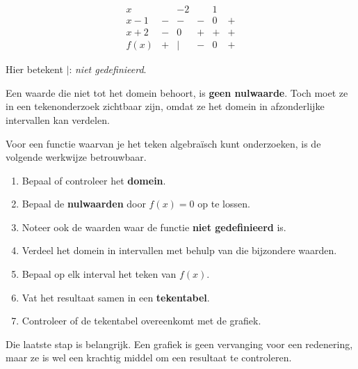 \documentclass{ximera}
\begin{document}
\[
\begin{array}{c|ccccc}
x & & -2 &  & 1 & \\
\hline
x-1 & - & - & - & 0 & +\\
x+2 & - & 0 & + & + & +\\
\hline
f(x) & + & \mid & - & 0 & +
\end{array}
\]

Hier betekent \(\mid\): \emph{niet gedefinieerd}.

\begin{opmerking}
Een waarde die niet tot het domein behoort, is \textbf{geen nulwaarde}.
Toch moet ze in een tekenonderzoek zichtbaar zijn, omdat ze het domein
in afzonderlijke intervallen kan verdelen.
\end{opmerking}




Voor een functie waarvan je het teken algebraïsch kunt onderzoeken,
is de volgende werkwijze betrouwbaar.

\begin{eigenschap}
\begin{enumerate}
    \item Bepaal of controleer het \textbf{domein}.
    \item Bepaal de \textbf{nulwaarden} door \(f(x)=0\) op te lossen.
    \item Noteer ook de waarden waar de functie \textbf{niet gedefinieerd} is.
    \item Verdeel het domein in intervallen met behulp van die bijzondere waarden.
    \item Bepaal op elk interval het teken van \(f(x)\).
    \item Vat het resultaat samen in een \textbf{tekentabel}.
    \item Controleer of de tekentabel overeenkomt met de grafiek.
\end{enumerate}
\end{eigenschap}

Die laatste stap is belangrijk.
Een grafiek is geen vervanging voor een redenering,
maar ze is wel een krachtig middel om een resultaat te controleren.


\end{document}

